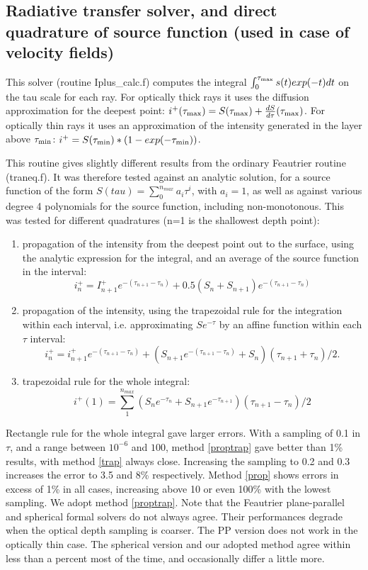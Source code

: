 \documentclass[a4paper,12pt]{article}
\begin{document}
\subsection{Radiative transfer solver, and direct quadrature of source function (used in case of velocity fields)}
This solver (routine Iplus\_calc.f) computes the integral ${\int_0^{\tau_{\rm max}}s(t) exp(-t) dt}$ on the tau scale for each 
ray. For optically thick rays it uses the diffusion approximation for the deepest point: 
$i^+(\tau_{\rm max}) = S(\tau_{\rm max})+\frac{dS}{d\tau}(\tau_{\rm max})$.
For optically thin rays it uses an approximation of the intensity generated in the layer above $\tau_{\rm min}$: 
$i^+ = S(\tau_{\rm min}) * (1-exp(-\tau_{\rm min}))$.

This routine gives slightly different results from the ordinary Feautrier routine (traneq.f). It was therefore tested against
an analytic solution, for a source function of the form $S(tau)=\sum_0^{n_{max}}{a_i \tau^i}$, with $a_i = 1$, as well as against various degree 4 polynomials for the source function, including non-monotonous.
This was tested  for different quadratures (n=1 is the shallowest depth point):
\begin{enumerate}
\item propagation of the intensity from the deepest point out to the surface, using the analytic expression for the integral, 
and an average of the source function in the interval: 
$$i^+_n=I^+_{n+1} e^{-(\tau_{n+1}-\tau_{n})} + 0.5 (S_{n}+S_{n+1}) e^{-(\tau_{n+1}-\tau_{n})}$$\label{prop}
\item propagation of the intensity, using the trapezoidal rule for the integration within each interval, i.e. approximating $Se^{-\tau}$ by an affine function within each $\tau$ interval: 
$$i^+_n=i^+_{n+1} e^{-(\tau_{n+1}-\tau_{n})}+ (S_{n+1} e^{-(\tau_{n+1}-\tau_{n})} + S_n) (\tau_{n+1}+\tau_n)/2.$$\label{proptrap}
\item trapezoidal rule for the whole integral: 
$$i^+(1)=\sum_1^{n_{max}}{(S_{n}e^{-\tau_n}+S_{n+1}e^{-\tau_{n+1}})(\tau_{n+1}-\tau_{n})/2}$$\label{trap}
\end{enumerate}
Rectangle rule for the whole integral gave larger errors.
With a sampling of 0.1 in $\tau$, and a range between $10^{-6}$ and $100$, method \ref{proptrap} gave better than 1\% results, with method \ref{trap} always close. Increasing the sampling to 0.2 and 0.3 increases the error to 
3.5 and 8\% respectively.
Method \ref{prop} shows errors in excess of 1\% in all cases, increasing above 10 or even 100\% with the lowest sampling.
We adopt method \ref{proptrap}.
Note that the Feautrier plane-parallel and spherical formal solvers do not always agree. Their performances degrade
when the optical depth sampling is coarser. The PP version does not work in the optically thin case.
The spherical version and our adopted method agree within less than a percent most of the time, and occasionally differ a 
little more.
\end{document}
